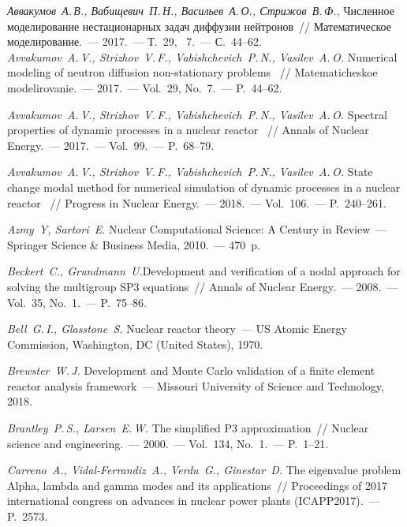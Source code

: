 \documentclass{crm-article}
\begin{document}
\begin{thebibliography}

 {\it Аввакумов~А.\,В., Вабищевич~П.\,Н., Васильев~А.\,О., Стрижов~В.\,Ф.,} 
Численное моделирование нестационарных задач диффузии нейтронов~// Математическое моделирование.~--- 2017.~--- Т.~29, \No~7.~--- С.~44--62.
\\
{\footnotesize{\it Avvakumov~A.\,V., Strizhov~V.\,F., Vabishchevich~P.\,N., Vasilev~A.\,O.}
Numerical modeling of neutron diffusion non-stationary problems ~// Matematicheskoe modelirovanie.~--- 2017.~--- Vol.~29, No.~7.~--- P.~44--62.}

 {\it Avvakumov~A.\,V., Strizhov~V.\,F., Vabishchevich~P.\,N., Vasilev~A.\,O.} Spectral properties of dynamic processes in a nuclear reactor ~// Annals of Nuclear Energy.~--- 2017.~--- Vol.~99.~--- P.~68--79.

 {\it Avvakumov~A.\,V., Strizhov~V.\,F., Vabishchevich~P.\,N., Vasilev~A.\,O.} State change modal method for numerical simulation of dynamic processes in a nuclear reactor ~// Progress in Nuclear Energy.~--- 2018.~--- Vol.~106.~--- P.~240--261.

 {\it Azmy~Y, Sartori~E.} Nuclear Computational Science: A Century in Review~--- Springer Science \& Business Media, 2010.~--- 470~p.

 {\it Beckert~C., Grundmann~U.}Development and verification of a nodal approach for solving the multigroup SP3 equations~// Annals of Nuclear Energy.~--- 2008.~--- Vol.~35, No.~1.~--- P.~75--86.

 {\it Bell~G.\,I., Glasstone~S.} Nuclear reactor theory~--- US Atomic Energy Commission, Washington, DC (United States), 1970.

 {\it Brewster~W.\,J.} Development and Monte Carlo validation of a finite element reactor analysis framework~--- Missouri University of Science and Technology, 2018.

 {\it Brantley~P.\,S., Larsen~E.\,W.} The simplified P3 approximation~// Nuclear science and engineering.~--- 2000.~--- Vol.~134, No.~1.~--- P.~1--21.

 {\it Carreno~A., Vidal-Ferrandiz~A., Verdu~G., Ginestar~D.} The eigenvalue problem Alpha, lambda and gamma modes and its applications~// Proceedings of 2017 international congress on advances in nuclear power plants (ICAPP2017).~--- P.~2573.


\end{thebibliography}
\end{document}
